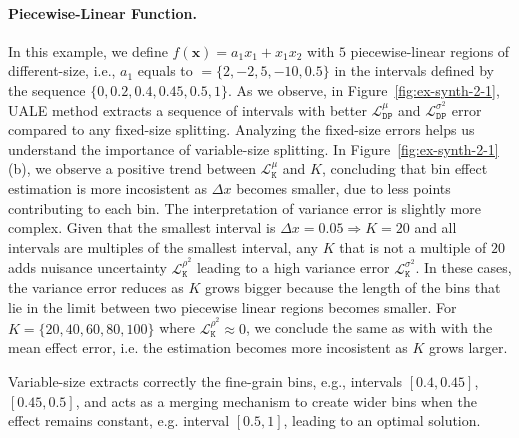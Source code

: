 \documentclass[twoside]{article}
\begin{document}
\paragraph{Piecewise-Linear Function.}

In this example, we define \(f(\mathbf{x}) = a_1x_1 + x_1x_2\) with
\(5\) piecewise-linear regions of different-size, i.e., \(a_1\) equals
to \(=\{2, -2, 5, -10, 0.5\}\) in the intervals defined by the
sequence \(\{0, 0.2, 0.4, 0.45, 0.5, 1\}\). As we observe, in
Figure~\ref{fig:ex-synth-2-1}, UALE method extracts a sequence of
intervals with better \(\mathcal{L}_{\mathtt{DP}}^{\mu}\) and
\(\mathcal{L}_{\mathtt{DP}}^{\sigma^2}\) error compared to any
fixed-size splitting. Analyzing the fixed-size errors helps us
understand the importance of variable-size splitting. In
Figure~\ref{fig:ex-synth-2-1}(b), we observe a positive trend between
\(\mathcal{L}^{\mu}_{\mathtt{K}}\) and \(K\), concluding that bin
effect estimation is more incosistent as \(\Delta x\) becomes smaller,
due to less points contributing to each bin. The interpretation of
variance error is slightly more complex. Given that the smallest
interval is \(\Delta x = 0.05 \Rightarrow K = 20\) and all intervals
are multiples of the smallest interval, any \(K\) that is not a
multiple of \(20\) adds nuisance uncertainty
\(\mathcal{L}^{\rho^2}_{\mathtt{K}}\) leading to a high variance error
\(\mathcal{L}^{\sigma^2}_{\mathtt{K}}\). In these cases, the variance
error reduces as \(K\) grows bigger because the length of the bins
that lie in the limit between two piecewise linear regions becomes
smaller. For \(K=\{20, 40, 60, 80, 100\}\) where
\(\mathcal{L}^{\rho^2}_{\mathtt{K}} \approx 0\), we conclude the same
as with with the mean effect error, i.e. the estimation becomes more
incosistent as \(K\) grows larger.

Variable-size extracts correctly the fine-grain bins, e.g., intervals
\([0.4, 0.45]\), \([0.45, 0.5]\), and acts as a merging mechanism to
create wider bins when the effect remains constant, e.g. interval
\([0.5, 1]\), leading to an optimal solution.
\end{document}
